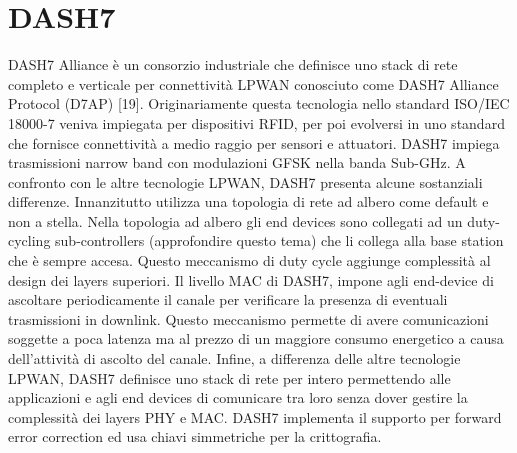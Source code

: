 \documentclass[12pt,a4paper,openright,twoside]{report}
\begin{document}
\section{DASH7}
DASH7 Alliance \`e un consorzio industriale che definisce uno stack di rete completo e verticale per connettivit\`a LPWAN conosciuto come DASH7 Alliance Protocol (D7AP) [19]. 
Originariamente questa tecnologia nello standard ISO/IEC 18000-7 veniva impiegata per dispositivi RFID, per poi evolversi in uno standard che fornisce connettivit\`a a medio raggio per sensori e attuatori.
DASH7 impiega trasmissioni narrow band con modulazioni GFSK nella banda Sub-GHz.   
A confronto con le altre tecnologie LPWAN, DASH7 presenta alcune sostanziali differenze.
Innanzitutto utilizza una topologia di rete ad albero come default e non a stella.
Nella topologia ad albero gli end devices sono collegati ad un duty-cycling sub-controllers (approfondire questo tema) che li collega alla base station che \`e sempre accesa. 
Questo meccanismo di duty cycle aggiunge complessit\`a al design dei layers superiori.   
Il livello MAC di DASH7, impone agli end-device di ascoltare periodicamente il canale per verificare la presenza di eventuali trasmissioni in downlink. Questo meccanismo permette di avere comunicazioni soggette a poca latenza ma al prezzo di un maggiore consumo energetico a causa dell'attivit\`a di ascolto del canale.
Infine, a differenza delle altre tecnologie LPWAN, DASH7 definisce uno stack di rete per intero permettendo alle applicazioni e agli end devices di comunicare tra loro senza dover gestire la complessit\`a dei layers PHY e MAC.
DASH7 implementa il supporto per forward error correction ed usa chiavi simmetriche per la crittografia.
\end{document}
